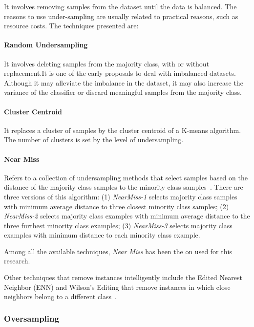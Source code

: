 It involves removing samples from the dataset until the data
is balanced. The reasons to use under-sampling are usually related to practical 
reasons, such as resource costs. The techniques presented are:

\paragraph{Random Undersampling}

It involves deleting samples from the majority class, with or without 
replacement.It is one of the early proposals to deal with imbalanced datasets.
Although it may alleviate the imbalance in the dataset, it may also increase the
variance of the classifier or discard meaningful samples from the majority 
class.

\paragraph{Cluster Centroid}

It replaces a cluster of samples by the cluster centroid of a K-means 
algorithm. The number of clusters is set by the level of undersampling.

\paragraph{Near Miss}\label{nearmiss}

Refers to a collection of undersampling methods that select samples based on 
the distance of the majority class samples to the minority class 
samples~\cite{Zhang03}. There are three versions of this algorithm: 
(1) \textit{NearMiss-1} selects majority class samples with minimum average
distance to three closest minority class samples; 
(2) \textit{NearMiss-2} selects majority class examples with minimum average 
distance to the three furthest minority class examples;
(3) \textit{NearMiss-3} selects majority class examples with minimum distance 
to each minority class example.

Among all the available techniques, \textit{Near Miss} has been the on used
for this research.

Other techniques that remove instances intelligently include the Edited Nearest
Neighbor (ENN) and Wilson's Editing that remove instances in which close 
neighbors belong to a  different class~\cite{wilson1972asymptotic}.

\subsubsection{Oversampling}\label{sec:oversampling}

